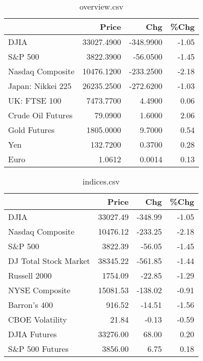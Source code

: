 \documentclass{article}%
\begin{document}
\begin{table}[htbp]%
\caption{overview.csv}%
\centering%
\begin{adjustbox}{width=1\textwidth}%
\begin{tabular}{lrrr}
\toprule
                  &      Price &       Chg &  \%Chg \\
\midrule
             DJIA & 33027.4900 & -348.9900 & -1.05 \\
          S\&P 500 &  3822.3900 &  -56.0500 & -1.45 \\
 Nasdaq Composite & 10476.1200 & -233.2500 & -2.18 \\
Japan: Nikkei 225 & 26235.2500 & -272.6200 & -1.03 \\
     UK: FTSE 100 &  7473.7700 &    4.4900 &  0.06 \\
Crude Oil Futures &    79.0900 &    1.6000 &  2.06 \\
     Gold Futures &  1805.0000 &    9.7000 &  0.54 \\
              Yen &   132.7200 &    0.3700 &  0.28 \\
             Euro &     1.0612 &    0.0014 &  0.13 \\
\bottomrule
\end{tabular}
%
\end{adjustbox}%
\end{table}

%


\begin{table}[htbp]%
\caption{indices.csv}%
\centering%
\begin{adjustbox}{width=1\textwidth}%
\begin{tabular}{lrrr}
\toprule
                      &    Price &     Chg &  \%Chg \\
\midrule
                 DJIA & 33027.49 & -348.99 & -1.05 \\
     Nasdaq Composite & 10476.12 & -233.25 & -2.18 \\
              S\&P 500 &  3822.39 &  -56.05 & -1.45 \\
DJ Total Stock Market & 38345.22 & -561.85 & -1.44 \\
         Russell 2000 &  1754.09 &  -22.85 & -1.29 \\
       NYSE Composite & 15081.53 & -138.02 & -0.91 \\
         Barron's 400 &   916.52 &  -14.51 & -1.56 \\
      CBOE Volatility &    21.84 &   -0.13 & -0.59 \\
         DJIA Futures & 33276.00 &   68.00 &  0.20 \\
      S\&P 500 Futures &  3856.00 &    6.75 &  0.18 \\
\bottomrule
\end{tabular}
%
\end{adjustbox}%
\end{table}
\end{document}
